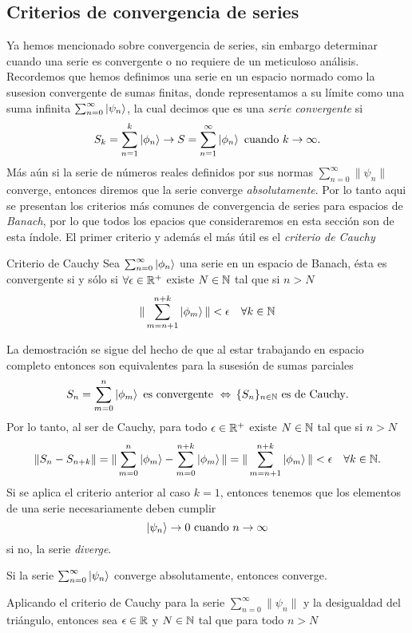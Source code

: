 \documentclass[main.tex]{subfiles}
\begin{document}
\subsection{Criterios de convergencia de series}
\noindent Ya hemos mencionado sobre convergencia de series, sin embargo determinar cuando una serie es convergente o no requiere de un meticuloso análisis. Recordemos que hemos definimos una serie en un espacio normado como la susesion convergente de sumas finitas, donde representamos a su límite como una suma infinita \(\sum_{n=0}^{\infty}\ket{\psi_n}\), la cual decimos que es una \emph{serie convergente} si
\[
    S_k=\sum_{n=1}^k\ket{\phi_n}\rightarrow S=\sum_{n=1}^{\infty}\ket{\phi_n}\text{ cuando }k\rightarrow\infty.
\]
\noindent Más aún si la serie de números reales definidos por sus normas  \(\sum_{n=0}^{\infty}\|\psi_n\|\) converge, entonces diremos que la serie converge \emph{absolutamente}.
Por lo tanto aqui se presentan los criterios más comunes de convergencia de series para espacios de \emph{Banach}, por lo que todos los epacios que consideraremos en esta sección son de esta índole. El primer criterio y además el más útil es el \emph{criterio de Cauchy}
\begin{prop}{Criterio de Cauchy}
  Sea \(\sum_{n=0}^{\infty}\ket{\phi_n}\) una serie en un espacio de Banach, ésta es convergente si y sólo si \(\forall\epsilon\in\mathbb R ^{+}\) existe \(N\in \mathbb N \) tal que si \(n>N\)
  \[
    \|\sum_{m=n+1}^{n+k}\ket{\phi_m}\|<\epsilon\quad\forall k\in \mathbb N 
  \]
\end{prop}
\dem La demostración se sigue del hecho de que al estar trabajando en espacio completo entonces son equivalentes para la susesión de sumas parciales
\[
    S_n=\sum_{m=0}^{n}\ket{\phi_m}\text{ es convergente }\Leftrightarrow\,\{S_n\}_{n\in \mathbb N }\text{ es de Cauchy}.
\]
\noindent Por lo tanto, al ser de Cauchy, para todo \(\epsilon\in\mathbb R ^{+}\) existe \(N\in \mathbb N \) tal que si \(n>N\)
\[
   \|S_n-S_{n+k}\|=\|\sum_{m=0}^{n}\ket{\phi_m}-\sum_{m=0}^{n+k}\ket{\phi_m}\|=\|\sum_{m=n+1}^{n+k}\ket{\phi_m}\|<\epsilon\quad\forall k\in \mathbb N .
\]
\obs Si se aplica el criterio anterior al caso \(k=1\), entonces tenemos que los elementos de una serie necesariamente deben cumplir
\[
    \ket{\psi_n}\rightarrow 0\text{ cuando } n\to\infty
\]
si no, la serie \emph{diverge}.
\QED
\begin{prop}
  Si la serie \(\sum_{n=0}^{\infty}\ket{\psi_n}\) converge absolutamente, entonces converge.
  \end{prop}
\dem Aplicando el criterio de Cauchy para la serie \(\sum_{n=0}^{\infty}\|\psi_n\|\) y la desigualdad del triángulo, entonces sea \(\epsilon\in\mathbb R \) y \(N\in \mathbb N \) tal que para todo \(n>N\)
\end{document}
